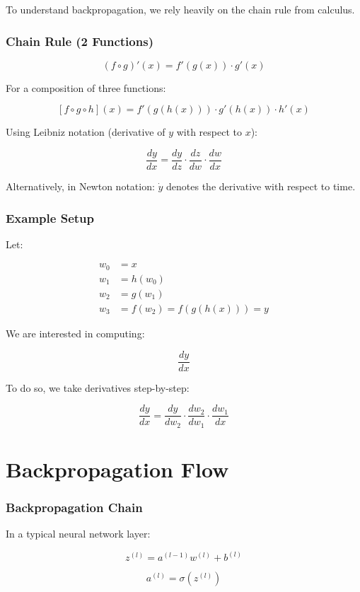 To understand backpropagation, we rely heavily on the chain rule from calculus.

\subsubsection*{Chain Rule (2 Functions)}

\[
(f \circ g)'(x) = f'(g(x)) \cdot g'(x)
\]

For a composition of three functions:

\[
[f \circ g \circ h](x) = f'(g(h(x))) \cdot g'(h(x)) \cdot h'(x)
\]

Using Leibniz notation (derivative of $y$ with respect to $x$):

\[
\frac{dy}{dx} = \frac{dy}{dz} \cdot \frac{dz}{dw} \cdot \frac{dw}{dx}
\]

Alternatively, in Newton notation: $\dot{y}$ denotes the derivative with respect to time.

\subsubsection*{Example Setup}

Let:

\begin{align*}
w_0 &= x \\
w_1 &= h(w_0) \\
w_2 &= g(w_1) \\
w_3 &= f(w_2) = f(g(h(x))) = y
\end{align*}

We are interested in computing:

\[
\frac{dy}{dx}
\]

To do so, we take derivatives step-by-step:

\[
\frac{dy}{dx} = \frac{dy}{dw_2} \cdot \frac{dw_2}{dw_1} \cdot \frac{dw_1}{dx}
\]

\section{Backpropagation Flow}

\subsubsection*{Backpropagation Chain}

In a typical neural network layer:

\[
z^{(l)} = a^{(l-1)} w^{(l)} + b^{(l)}
\]

\[
a^{(l)} = \sigma(z^{(l)})
\]

